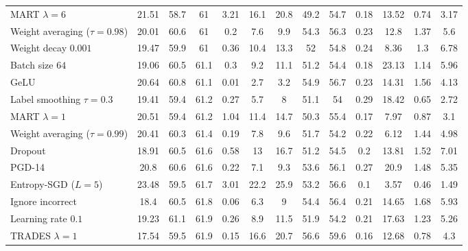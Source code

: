 \begin{table}[t]
{\begin{tabularx}{\textwidth}{|X|c|c|c||c|c|c||c|c||c|c|c|c|}
		\rowcolor{colorbrewer1!15}\hspace*{2px} MART $\lambda{=}6$ & 21.51 & 58.7 & 61 & 3.21 & 16.1 & 20.8 & 49.2 & 54.7 & 0.18 & 13.52 & 0.74 & 3.17\\
		\rowcolor{colorbrewer1!15}\hspace*{2px} Weight averaging ($\tau{=}0.98$) & 20.01 & 60.6 & 61 & 0.2 & 7.6 & 9.9 & 54.3 & 56.3 & 0.23 & 12.8 & 1.37 & 5.6\\
		\rowcolor{colorbrewer1!15}\hspace*{2px} Weight decay $0.001$ & 19.47 & 59.9 & 61 & 0.36 & 10.4 & 13.3 & 52 & 54.8 & 0.24 & 8.36 & 1.3 & 6.78\\
		\rowcolor{colorbrewer1!15}\hspace*{2px} Batch size $64$ & 19.06 & 60.5 & 61.1 & 0.3 & 9.2 & 11.1 & 51.2 & 54.4 & 0.18 & 23.13 & 1.14 & 5.96\\
		\rowcolor{colorbrewer1!15}\hspace*{2px} GeLU & 20.64 & 60.8 & 61.1 & 0.01 & 2.7 & 3.2 & 54.9 & 56.7 & 0.23 & 14.31 & 1.56 & 4.13\\
		\rowcolor{colorbrewer1!15}\hspace*{2px} Label smoothing $\tau{=}0.3$ & 19.41 & 59.4 & 61.2 & 0.27 & 5.7 & 8 & 51.1 & 54 & 0.29 & 18.42 & 0.65 & 2.72\\
		\rowcolor{colorbrewer1!15}\hspace*{2px} MART $\lambda{=}1$ & 20.51 & 59.4 & 61.2 & 1.04 & 11.4 & 14.7 & 50.3 & 55.4 & 0.17 & 7.97 & 0.87 & 3.1\\
		\rowcolor{colorbrewer1!15}\hspace*{2px} Weight averaging ($\tau{=}0.99$) & 20.41 & 60.3 & 61.4 & 0.19 & 7.8 & 9.6 & 51.7 & 54.2 & 0.22 & 6.12 & 1.44 & 4.98\\
		\rowcolor{colorbrewer1!15}\hspace*{2px} Dropout & 18.91 & 60.5 & 61.6 & 0.58 & 13 & 16.7 & 51.2 & 54.5 & 0.2 & 13.81 & 1.52 & 7.01\\
		\rowcolor{colorbrewer1!15}\hspace*{2px} PGD-14 & 20.8 & 60.6 & 61.6 & 0.22 & 7.1 & 9.3 & 53.6 & 56.1 & 0.27 & 20.9 & 1.48 & 5.35\\

		\rowcolor{colorbrewer1!15}\hspace*{2px} Entropy-SGD ($L{=}5$) & 23.48 & 59.5 & 61.7 & 3.01 & 22.2 & 25.9 & 53.2 & 56.6 & 0.1 & 3.57 & 0.46 & 1.49\\
		\rowcolor{colorbrewer1!15}\hspace*{2px} Ignore incorrect & 18.4 & 60.5 & 61.8 & 0.06 & 6.3 & 9 & 54.4 & 56.4 & 0.21 & 14.65 & 1.68 & 5.93\\
		\rowcolor{colorbrewer1!15}\hspace*{2px} Learning rate $0.1$ & 19.23 & 61.1 & 61.9 & 0.26 & 8.9 & 11.5 & 51.9 & 54.2 & 0.21 & 17.63 & 1.23 & 5.26\\
		\rowcolor{colorbrewer1!15}\hspace*{2px} TRADES $\lambda{=}1$ & 17.54 & 59.5 & 61.9 & 0.15 & 16.6 & 20.7 & 56.6 & 59.6 & 0.16 & 12.68 & 0.78 & 4.3\\
		

\end{tabularx}}
\end{table}

